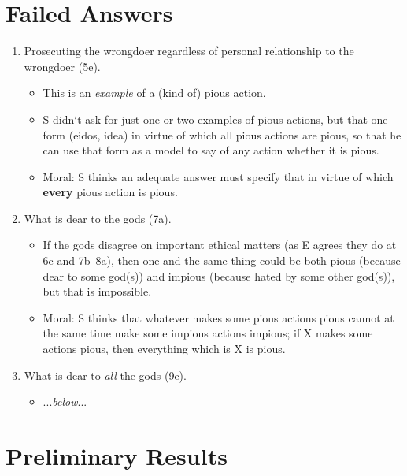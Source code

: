 \documentclass[oneside]{article}
\begin{document}
\section*{Failed Answers}
\begin{enumerate}
\item Prosecuting the wrongdoer regardless of personal relationship to the wrongdoer (5e).

\begin{itemize}\item{This is an \emph{example} of a (kind of) pious action.}
\item S didn`t ask for just one or two examples of pious  actions, but that one form (eidos, idea) in virtue of which all pious actions are pious, so that he can use that form as a model to say of any action whether it is pious.

\item{Moral: S thinks an adequate answer must specify that in virtue of which \textbf{every} pious action is pious.}\end{itemize}

\item{What is dear to the gods (7a).}

\begin{itemize}\item{If the gods disagree on important ethical matters (as E agrees they do at 6c and 7b--8a), then one and the same thing could be both pious (because dear to some god(s)) and impious (because hated by some other god(s)), but that is impossible.}
\item{Moral: S thinks that whatever makes some pious actions pious cannot at the same time make some impious actions impious; if X makes some actions pious, then everything which is X is pious.}\end{itemize}

\item{What is dear to \emph{all} the gods (9e).}
\begin{itemize}
\item{...\emph{below}...}
\end{itemize}
\end{enumerate}


\section*{Preliminary Results}
\end{document}
